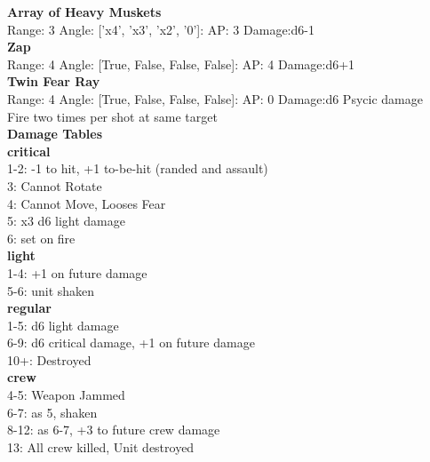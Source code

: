 {\bf Array of Heavy Muskets } \\



Range: 3  Angle: ['x4', 'x3', 'x2', '0']: AP: 3 Damage:d6-1 \\




{\bf Zap } \\



Range: 4  Angle: [True, False, False, False]: AP: 4 Damage:d6+1 \\




{\bf Twin Fear Ray } \\



Range: 4  Angle: [True, False, False, False]: AP: 0 Damage:d6 Psycic damage \\
Fire two times per shot at same target\\ 




 





{\bf Damage Tables} \\
 {\bf critical } \\
1-2: -1 to hit, +1 to-be-hit (randed and assault) \\
3: Cannot Rotate \\
4: Cannot Move, Looses Fear \\
5: x3 d6 light damage \\
6: set on fire \\
 {\bf light } \\
1-4: +1 on future damage \\
5-6: unit shaken \\
 {\bf regular } \\
1-5: d6 light damage \\
6-9: d6 critical damage, +1 on future damage \\
10+: Destroyed \\
 {\bf crew } \\
4-5: Weapon Jammed \\
6-7: as 5, shaken \\
8-12: as 6-7, +3 to future crew damage \\
13: All crew killed, Unit destroyed \\










